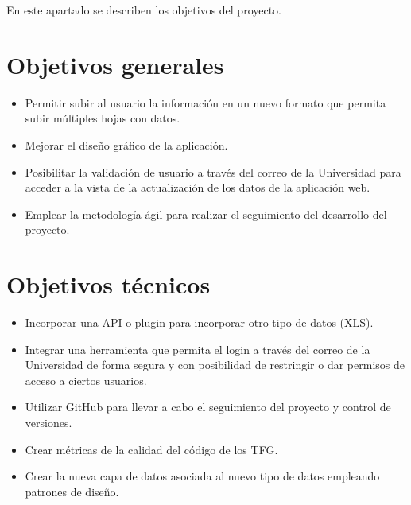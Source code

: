 En este apartado se describen los objetivos del proyecto.

\section{Objetivos generales}

\begin{itemize}
	\item Permitir subir al usuario la información en un nuevo formato que permita subir múltiples hojas con datos.
	\item Mejorar el diseño gráfico de la aplicación.
	\item Posibilitar la validación de usuario a través del correo de la Universidad para acceder a la vista de la actualización de los datos de la aplicación web.
	\item Emplear la metodología ágil para realizar el seguimiento del desarrollo del proyecto.
\end{itemize}

\section{Objetivos técnicos}
\begin{itemize}
	\item Incorporar una API o plugin para incorporar otro tipo de datos (XLS).
	\item Integrar una herramienta que permita el login a través del correo de la Universidad de forma segura y con posibilidad de restringir o dar permisos de acceso a ciertos usuarios. 
	\item Utilizar GitHub para llevar a cabo el seguimiento del proyecto y control de versiones.
	\item Crear métricas de la calidad del código de los TFG.
	\item Crear la nueva capa de datos asociada al nuevo tipo de datos empleando patrones de diseño.
\end{itemize}